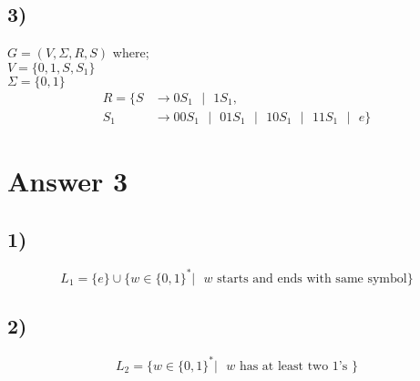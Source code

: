 \documentclass[12pt]{article}
\begin{document}
\subsection*{3)}
$G = (V, \Sigma, R, S)$ where; \\ 
$V = \{0,1,S,S_1\}$ \\ 
$\Sigma = \{0,1\}$
\begin{equation*}
    \begin{split}
        R = \{S &\rightarrow 0 S_1 \text{ } | \text{ } 1 S_1, \\ 
        S_1 &\rightarrow 00 S_1  \text{ } | \text{ } 01 S_1  \text{ } | \text{ } 10 S_1  \text{ } | \text{ } 11 S_1  \text{ } | \text{ } e \}
    \end{split}
\end{equation*}




\section*{Answer 3}
\subsection*{1)}
$$L_1 = \{e\} \cup \{w \in \{0,1\}^*| \text{ $w$ starts and ends with same symbol}\}$$

\subsection*{2)}
$$L_2 = \{w \in \{0,1\}^* | \text{ $w$ has at least two 1's }\}$$
\end{document}
